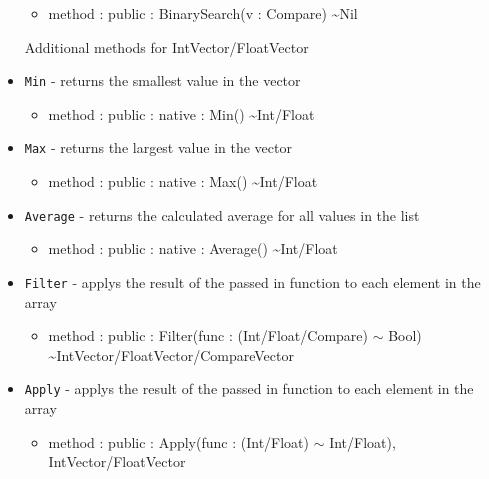 \documentclass[12pt]{article}
\begin{document}
\begin{itemize}
\begin{itemize}
  \item method : public : BinarySearch(v : Compare) \textasciitilde Nil
  \end{itemize}
  Additional methods for IntVector/FloatVector
\item \texttt{Min} - returns the smallest value in the vector
  \begin{itemize}
  \item method : public : native : Min() \textasciitilde Int/Float
  \end{itemize}
\item \texttt{Max} - returns the largest value in the vector
  \begin{itemize}
  \item method : public : native : Max() \textasciitilde Int/Float
  \end{itemize}
\item \texttt{Average} - returns the calculated average for all values
  in the list
  \begin{itemize}
  \item method : public : native : Average() \textasciitilde Int/Float
  \end{itemize}
\item \texttt{Filter} - applys the result of the passed in function to
  each element in the array
  \begin{itemize}
  \item method : public : Filter(func : (Int/Float/Compare) $\sim$
    Bool) \textasciitilde IntVector/FloatVector/CompareVector
  \end{itemize}
\item \texttt{Apply} - applys the result of the passed in function to
  each element in the array
  \begin{itemize}
  \item method : public : Apply(func : (Int/Float) $\sim$ Int/Float),
    IntVector/FloatVector
  \end{itemize}
\end{itemize}
\end{document}
